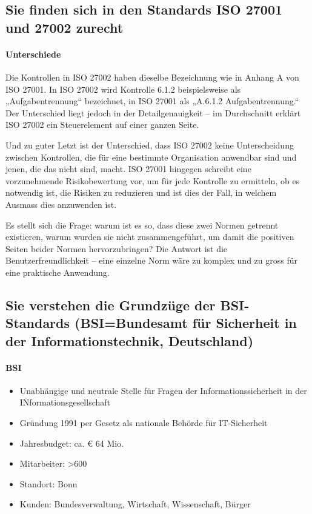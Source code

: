 \documentclass[10pt,a4paper]{article}
\begin{document}
\subsection*{Sie finden sich in den Standards ISO 27001 und 27002 zurecht}
\paragraph*{Unterschiede}Die Kontrollen in ISO 27002 haben dieselbe Bezeichnung wie in Anhang A von ISO 27001. In ISO 27002 wird Kontrolle 6.1.2 beispielsweise als „Aufgabentrennung“ bezeichnet, in ISO 27001 als „A.6.1.2 Aufgabentrennung.“ Der Unterschied liegt jedoch in der Detailgenauigkeit – im Durchschnitt erklärt ISO 27002 ein Steuerelement auf einer ganzen Seite.

Und zu guter Letzt ist der Unterschied, dass ISO 27002 keine Unterscheidung zwischen Kontrollen, die für eine bestimmte Organisation anwendbar sind und jenen, die das nicht sind, macht. ISO 27001 hingegen schreibt eine vorzunehmende Risikobewertung vor, um für jede Kontrolle zu ermitteln, ob es notwendig ist, die Risiken zu reduzieren und ist dies der Fall, in welchem Ausmass dies anzuwenden ist.

Es stellt sich die Frage: warum ist es so, dass diese zwei Normen getrennt existieren, warum wurden sie nicht zusammengeführt, um damit die positiven Seiten beider Normen hervorzubringen? Die Antwort ist die Benutzerfreundlichkeit – eine einzelne Norm wäre zu komplex und zu gross für eine praktische Anwendung\cite{advisera}.

\subsection*{Sie verstehen die Grundzüge der BSI-Standards (BSI=Bundesamt für Sicherheit in der Informationstechnik, Deutschland)}
\paragraph*{BSI}
\begin{itemize}[noitemsep,topsep=0pt,leftmargin=*]
    \item Unabhängige und neutrale Stelle für Fragen der Informationssicherheit in der INformationsgesellschaft
    \item Gründung 1991 per Gesetz als nationale Behörde für IT-Sicherheit
    \item Jahresbudget: ca. € 64 Mio.
    \item Mitarbeiter: \textgreater600
    \item Standort: Bonn
    \item Kunden: Bundesverwaltung, Wirtschaft, Wissenschaft, Bürger
\end{itemize}
\end{document}
